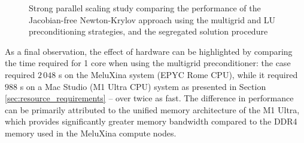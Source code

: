 \documentclass[sn-mathphys,Numbered]{sn-jnl}%
\begin{document}
\begin{figure}[htbp]
	\centering
	\caption{Strong parallel scaling study comparing the performance of the Jacobian-free Newton-Krylov approach using the multigrid and LU preconditioning strategies, and the segregated solution procedure}
	\label{fig:parallelisation_strong}
\end{figure}

As a final observation, the effect of hardware can be highlighted by comparing the time required for 1 core when using the multigrid preconditioner: the case required $2\,048$ s on the MeluXina system (EPYC Rome CPU), while it required $988$ s on a Mac Studio (M1 Ultra CPU) system as presented in Section \ref{sec:resource_requirements} -- over twice as fast.
The difference in performance can be primarily attributed to the unified memory architecture of the M1 Ultra, which provides significantly greater memory bandwidth compared to the DDR4 memory used in the MeluXina compute nodes.

\end{document}
